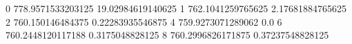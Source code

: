 0 778.9571533203125 19.02984619140625
1 762.1041259765625 2.17681884765625
2 760.150146484375 0.22283935546875
4 759.9273071289062 0.0
6 760.2448120117188 0.3175048828125
8 760.2996826171875 0.37237548828125
